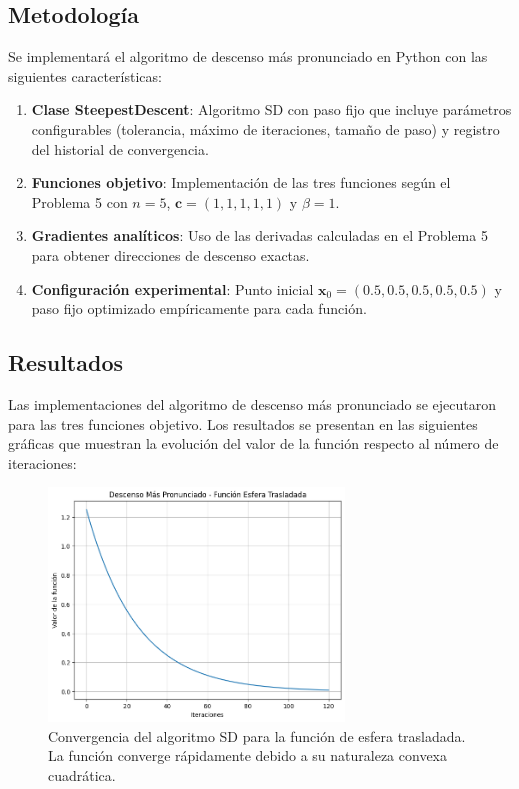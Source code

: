 \documentclass{article}
\begin{document}
\subsection{Metodología}

Se implementará el algoritmo de descenso más pronunciado en Python con las siguientes características:

\begin{enumerate}
    \item \textbf{Clase SteepestDescent}: Algoritmo SD con paso fijo que incluye parámetros configurables (tolerancia, máximo de iteraciones, tamaño de paso) y registro del historial de convergencia.
    
    \item \textbf{Funciones objetivo}: Implementación de las tres funciones según el Problema 5 con $n=5$, $\mathbf{c} = (1,1,1,1,1)$ y $\beta = 1$.
    
    \item \textbf{Gradientes analíticos}: Uso de las derivadas calculadas en el Problema 5 para obtener direcciones de descenso exactas.
    
    \item \textbf{Configuración experimental}: Punto inicial $\mathbf{x}_0 = (0.5, 0.5, 0.5, 0.5, 0.5)$ y paso fijo optimizado empíricamente para cada función.
\end{enumerate}

\subsection{Resultados}
\setcounter{equation}{0}

Las implementaciones del algoritmo de descenso más pronunciado se ejecutaron para las tres funciones objetivo. Los resultados se presentan en las siguientes gráficas que muestran la evolución del valor de la función respecto al número de iteraciones:

\begin{figure}[H]
\centering
\includegraphics[width=0.7\textwidth]{images/6_sphere.png}
\caption{Convergencia del algoritmo SD para la función de esfera trasladada. La función converge rápidamente debido a su naturaleza convexa cuadrática.}
\label{fig:sd_sphere}
\end{figure}
\end{document}
